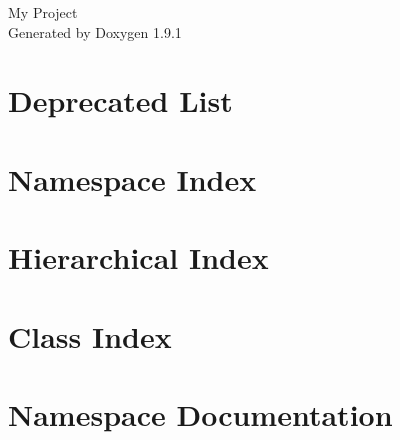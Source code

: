 \let\mypdfximage\pdfximage\def\pdfximage{\immediate\mypdfximage}\documentclass[twoside]{book}
\newcommand{\+}{\discretionary{\mbox{\scriptsize$\hookleftarrow$}}{}{}}
\newcommand{\clearemptydoublepage}{%
  \newpage{\pagestyle{empty}\cleardoublepage}%
}
\begin{document}
\raggedbottom

\hypersetup{pageanchor=false,
             bookmarksnumbered=true,
             pdfencoding=unicode
            }
\begin{titlepage}
\vspace*{7cm}
\begin{center}%
{\Large My Project }\\
\vspace*{1cm}
{\large Generated by Doxygen 1.9.1}\\
\end{center}
\end{titlepage}
\clearemptydoublepage
{}
\tableofcontents
\clearemptydoublepage
{}
\hypersetup{pageanchor=true}

\chapter{Deprecated List}
\label{deprecated}

\chapter{Namespace Index}

\chapter{Hierarchical Index}

\chapter{Class Index}

\chapter{Namespace Documentation}


\end{document}
